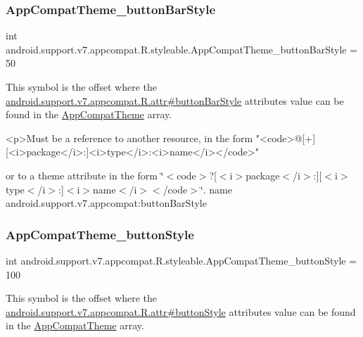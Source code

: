 \subsubsection{\texorpdfstring{App\+Compat\+Theme\+\_\+button\+Bar\+Style}{AppCompatTheme\_buttonBarStyle}}
{\footnotesize\ttfamily int android.\+support.\+v7.\+appcompat.\+R.\+styleable.\+App\+Compat\+Theme\+\_\+button\+Bar\+Style = 50\hspace{0.3cm}{\ttfamily [static]}}

This symbol is the offset where the \hyperlink{classandroid_1_1support_1_1v7_1_1appcompat_1_1R_1_1attr_a6910f254c6c12670fb4650919c7e0b67}{android.\+support.\+v7.\+appcompat.\+R.\+attr\#button\+Bar\+Style} attribute\textquotesingle{}s value can be found in the \hyperlink{classandroid_1_1support_1_1v7_1_1appcompat_1_1R_1_1styleable_a5c42f89e8a410c323be34208d75c430b}{App\+Compat\+Theme} array.

\begin{DoxyVerb}      <p>Must be a reference to another resource, in the form "<code>@[+][<i>package</i>:]<i>type</i>:<i>name</i></code>"
\end{DoxyVerb}
 or to a theme attribute in the form \char`\"{}$<$code$>$?\mbox{[}$<$i$>$package$<$/i$>$\+:\mbox{]}\mbox{[}$<$i$>$type$<$/i$>$\+:\mbox{]}$<$i$>$name$<$/i$>$$<$/code$>$\char`\"{}.  name android.\+support.\+v7.\+appcompat\+:button\+Bar\+Style \mbox{\label{classandroid_1_1support_1_1v7_1_1appcompat_1_1R_1_1styleable_a04456db225a82b7745bd0f1915afe311}} 
\subsubsection{\texorpdfstring{App\+Compat\+Theme\+\_\+button\+Style}{AppCompatTheme\_buttonStyle}}
{\footnotesize\ttfamily int android.\+support.\+v7.\+appcompat.\+R.\+styleable.\+App\+Compat\+Theme\+\_\+button\+Style = 100\hspace{0.3cm}{\ttfamily [static]}}

This symbol is the offset where the \hyperlink{classandroid_1_1support_1_1v7_1_1appcompat_1_1R_1_1attr_a6706ae73b0588849f93a4121b5769ea4}{android.\+support.\+v7.\+appcompat.\+R.\+attr\#button\+Style} attribute\textquotesingle{}s value can be found in the \hyperlink{classandroid_1_1support_1_1v7_1_1appcompat_1_1R_1_1styleable_a5c42f89e8a410c323be34208d75c430b}{App\+Compat\+Theme} array.

